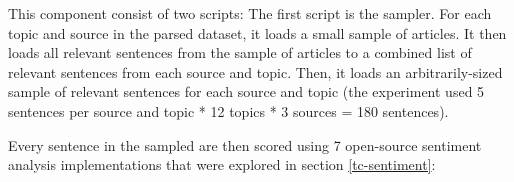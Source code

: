 \documentclass{report}
\begin{document}
This component consist of two scripts:
The first script is the sampler.
For each topic and source in the parsed dataset, it loads a small sample of articles.
It then loads all relevant sentences from the sample of articles to a combined list of relevant sentences from each source and topic.
Then, it loads an arbitrarily-sized sample of relevant sentences for each source and topic (the experiment used 5 sentences per source and topic * 12 topics * 3 sources = 180 sentences).

Every sentence in the sampled are then scored using 7 open-source sentiment analysis implementations that were explored in section \ref{tc-sentiment}:
\end{document}
